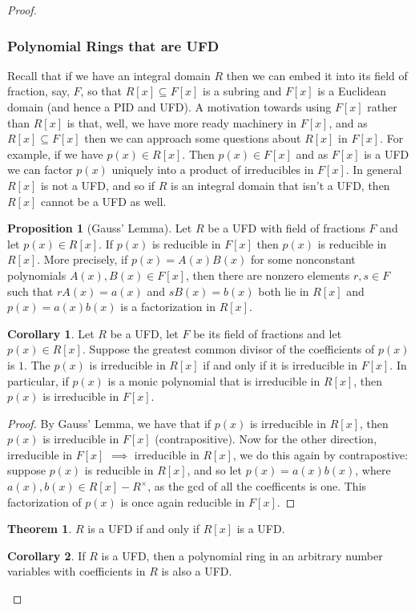 \documentclass[9pt,reqno]{amsart}
\theoremstyle{definition}
\newtheorem{theorem}{Theorem}[section]
\newtheorem{prop}{Proposition}[section]
\newtheorem{coro}{Corollary}[section]
\begin{document}
\begin{proof}
\subsubsection{Polynomial Rings that are UFD} Recall that if we have an integral domain $R$ then we can embed it into its field of fraction, say, $F$, so that $R[x] \subseteq F[x]$ is a subring and $F[x]$ is a Euclidean domain (and hence a PID and UFD). A motivation towards using $F[x]$ rather than $R[x]$ is that, well, we have more ready machinery in $F[x]$, and as $R[x] \subseteq F[x]$ then we can approach some questions about $R[x]$ in $F[x]$. For example, if we have $p(x) \in R[x]$. Then $p(x) \in F[x]$ and as $F[x]$ is a UFD we can factor $p(x)$ uniquely into a product of irreducibles in $F[x]$. In general $R[x]$ is not a UFD, and so if $R$ is an integral domain that isn't a UFD, then $R[x]$ cannot be a UFD as well. 



\begin{prop}[Gauss' Lemma] Let $R$ be a UFD with field of fractions $F$ and let $p(x) \in R[x]$. If $p(x)$ is reducible in $F[x]$ then $p(x)$ is reducible in $R[x]$. More precisely, if $p(x) = A(x)B(x)$ for some nonconstant polynomials $A(x), B(x) \in F[x]$, then there are nonzero elements $r,s \in F$ such that $r A(x) = a(x)$ and $sB(x) = b(x)$ both lie in $R[x]$ and $p(x) = a(x) b(x)$ is a factorization in $R[x]$. 	
\end{prop}
\begin{coro}
Let $R$ be a UFD, let $F$ be its field of fractions and let $p(x) \in R[x]$. Suppose the greatest common divisor of the coefficients of $p(x)$ is $1$. The $p(x)$ is irreducible in $R[x]$ if and only if it is irreducible in $F[x]$. In particular, if $p(x)$ is a monic polynomial that is irreducible in $R[x]$, then $p(x)$ is irreducible in $F[x]$. 
\end{coro}
\begin{proof}
	By Gauss' Lemma, we have that if $p(x)$ is irreducible in $R[x]$, then $p(x)$ is irreducible in $F[x]$ (contrapositive). Now for the other direction, irreducible in $F[x]$ $\implies$ irreducible in $R[x]$, we do this again by contrapostive: suppose $p(x)$ is reducible in $R[x]$, and so let $p(x) = a(x) b (x)$, where $a(x), b(x) \in R[x]-R^\times $, as the gcd of all the coefficents is one. This factorization of $p(x)$ is once again reducible in $F[x]$. 
\end{proof}
\begin{theorem}
	$R$ is a UFD if and only if $R[x]$ is a UFD.
\end{theorem}
\begin{coro}
If $R$ is a UFD, then a polynomial ring in an arbitrary number variables with coefficients in $R$ is also a UFD. 	
\end{coro}


\end{proof}
\end{document}
